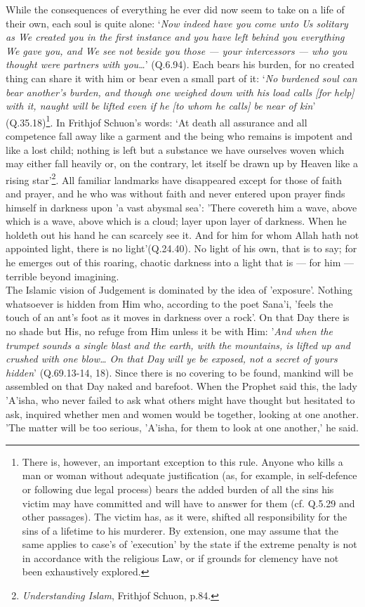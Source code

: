 \documentclass[10pt, twoside,openright]{book}
\begin{document}
While the consequences of everything he ever did now seem to take on a life of their own, each soul 
is quite alone: `\emph{Now indeed have you come unto Us solitary as We created you in the first instance 
and you have left behind you everything We gave you, and We see not beside you those --- your 
intercessors --- who you thought were partners with you\ldots{}}' (Q.6.94). Each bears his burden, for no 
created thing can share it with him or bear even a small part of it: `\emph{No burdened soul can bear 
another's burden, and though one weighed down with his load calls [for help] with it, naught will be 
lifted even if he [to whom he calls] be near of kin}' (Q.35.18)\footnote{There is, however, an important exception to this rule. Anyone who kills a man or woman without 
adequate justification (as, for example, in self\hyp{}defence or following due legal process) bears the 
added burden of all the sins his victim may have committed and will have to answer for them (cf. 
Q.5.29 and other passages). The victim has, as it were, shifted all responsibility for the sins of a 
lifetime to his murderer. By extension, one may assume that the same applies to case's of 'execution' 
by the state if the extreme penalty is not in accordance with the religious Law, or if grounds for 
clemency have not been exhaustively explored.}. In Frithjof Schuon's words: `At 
death all assurance and all competence fall away like a garment and the being who remains is impotent 
and like a lost child; nothing is left but a substance we have ourselves woven which may either fall 
heavily or, on the contrary, let itself be drawn up by Heaven like a rising star'\footnote{\emph{Understanding Islam}, Frithjof Schuon, p.84.}. All familiar 
landmarks have disappeared except for those of faith and prayer, and he who was without faith and 
never entered upon prayer finds himself in darkness upon 'a vast abysmal sea': 'There covereth him a 
wave, above which is a wave, above which is a cloud; layer upon layer of darkness. When he holdeth 
out his hand he can scarcely see it. And for him for whom Allah hath not appointed light, there is no 
light'(Q.24.40). No light of his own, that is to say; for he emerges out of this roaring, chaotic 
darkness into a light that is --- for him --- terrible beyond imagining. \\

The Islamic vision of Judgement is dominated by the idea of 'exposure'. Nothing whatsoever is hidden 
from Him who, according to the poet Sana'i, 'feels the touch of an ant's foot as it moves in darkness 
over a rock'. On that Day there is no shade but His, no refuge from Him unless it be with Him: '\emph{And 
when the trumpet sounds a single blast and the earth, with the mountains, is lifted up and crushed 
with one blow\ldots{} On that Day will ye be exposed, not a secret of yours hidden}' (Q.69.13\hyp{}14, 18). 
Since there is no covering to be found, mankind will be assembled on that Day naked and barefoot. 
When the Prophet said this, the lady 'A'isha, who never failed to ask what others might have thought 
but hesitated to ask, inquired whether men and women would be together, looking at one another. 'The 
matter will be too serious, 'A'isha, for them to look at one another,' he said. \\
\end{document}
